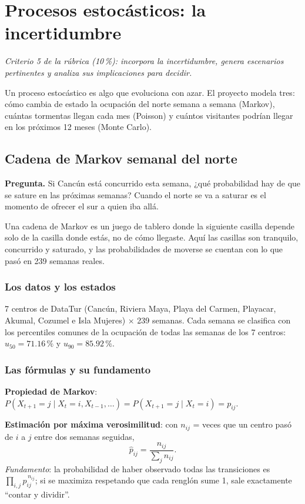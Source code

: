 \chapter{Procesos estocásticos: la incertidumbre}
\label{cap:estocasticos}
\textit{Criterio 5 de la rúbrica (10\,\%): incorpora la incertidumbre, genera escenarios pertinentes y analiza sus
implicaciones para decidir.}

Un proceso estocástico es algo que evoluciona con azar. El proyecto modela tres: cómo cambia de estado la ocupación del
norte semana a semana (Markov), cuántas tormentas llegan cada mes (Poisson) y cuántos visitantes podrían llegar en los
próximos 12 meses (Monte Carlo).

\section{Cadena de Markov semanal del norte}
\textbf{Pregunta.} Si Cancún está concurrido esta semana, ¿qué probabilidad hay de que se sature en las próximas semanas?
Cuando el norte se va a saturar es el momento de ofrecer el sur a quien iba allá.

\begin{intuicion}
Una cadena de Markov es un juego de tablero donde la siguiente casilla depende solo de la casilla donde estás, no de
cómo llegaste. Aquí las casillas son tranquilo, concurrido y saturado, y las probabilidades de moverse se cuentan con lo
que pasó en 239 semanas reales.
\end{intuicion}

\subsection{Los datos y los estados}
7 centros de DataTur (Cancún, Riviera Maya, Playa del Carmen, Playacar, Akumal, Cozumel e Isla Mujeres) $\times$ 239
semanas. Cada semana se clasifica con los percentiles comunes de la ocupación de todas las semanas de los 7 centros:
$u_{50}=71.16\,\%$ y $u_{90}=85.92\,\%$.

\subsection{Las fórmulas y su fundamento}
\textbf{Propiedad de Markov}: $P(X_{t+1}=j\mid X_t=i, X_{t-1},\dots)=P(X_{t+1}=j\mid X_t=i)=p_{ij}$.

\textbf{Estimación por máxima verosimilitud}: con $n_{ij}$ = veces que un centro pasó de $i$ a $j$ entre dos semanas
seguidas,
\[
\hat p_{ij}=\frac{n_{ij}}{\sum_j n_{ij}} .
\]
\emph{Fundamento}: la probabilidad de haber observado todas las transiciones es $\prod_{i,j}p_{ij}^{\,n_{ij}}$; si se
maximiza respetando que cada renglón sume 1, sale exactamente ``contar y dividir''.

